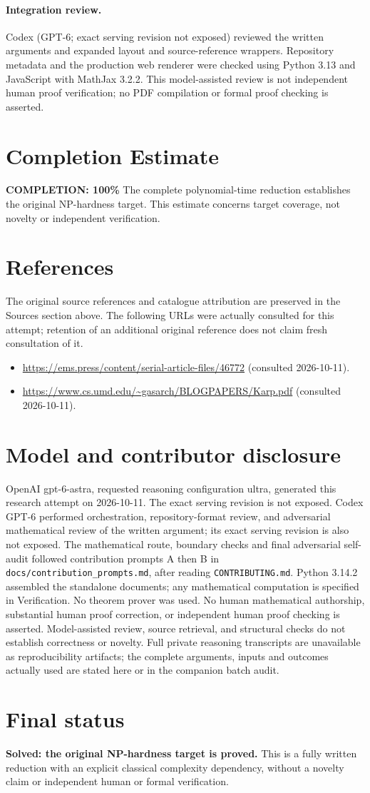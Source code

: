 \documentclass[11pt]{article}
\begin{document}
\paragraph{Integration review.} Codex (GPT-6; exact serving revision not exposed) reviewed the written arguments and expanded layout and source-reference wrappers. Repository metadata and the production web renderer were checked using Python 3.13 and JavaScript with MathJax 3.2.2. This model-assisted review is not independent human proof verification; no PDF compilation or formal proof checking is asserted.

\section{Completion Estimate}
\noindent\textbf{COMPLETION: 100\%}
The complete polynomial-time reduction establishes the original NP-hardness target.
This estimate concerns target coverage, not novelty or independent verification.
\section{References}
The original source references and catalogue attribution are preserved in the
Sources section above. The following URLs were actually consulted for this attempt;
retention of an additional original reference does not claim fresh consultation of it.
\begin{itemize}
\item \url{https://ems.press/content/serial-article-files/46772} (consulted 2026-10-11). 
\item \url{https://www.cs.umd.edu/~gasarch/BLOGPAPERS/Karp.pdf} (consulted 2026-10-11). 
\end{itemize}
\section{Model and contributor disclosure}
OpenAI gpt-6-astra, requested reasoning configuration ultra, generated this research
attempt on 2026-10-11. The exact serving revision is not exposed. Codex GPT-6
performed orchestration, repository-format review, and adversarial mathematical review of the written argument; its exact serving revision
is also not exposed. The mathematical route, boundary checks and final adversarial
self-audit followed contribution prompts A then B in
\texttt{docs/contribution\_prompts.md}, after reading \texttt{CONTRIBUTING.md}.
Python 3.14.2 assembled the standalone documents; any mathematical computation is
specified in Verification. No theorem prover was used. No human mathematical
authorship, substantial human proof correction, or independent human proof checking
is asserted. Model-assisted review, source retrieval, and structural checks do not
establish correctness or novelty. Full private reasoning transcripts are unavailable
as reproducibility artifacts; the complete arguments, inputs and outcomes actually
used are stated here or in the companion batch audit.
\section{Final status}
\textbf{Solved: the original NP-hardness target is proved.} This is a fully written
reduction with an explicit classical complexity dependency, without a novelty claim
or independent human or formal verification.
\end{document}

